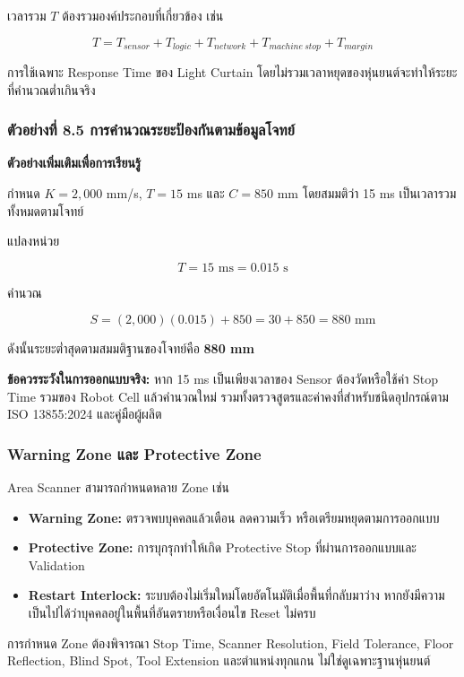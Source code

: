 เวลารวม $T$ ต้องรวมองค์ประกอบที่เกี่ยวข้อง เช่น

\[
T=T_{sensor}+T_{logic}+T_{network}+T_{machine\ stop}+T_{margin}
\]

การใช้เฉพาะ Response Time ของ Light Curtain โดยไม่รวมเวลาหยุดของหุ่นยนต์จะทำให้ระยะที่คำนวณต่ำเกินจริง

\subsubsection{ตัวอย่างที่ 8.5 การคำนวณระยะป้องกันตามข้อมูลโจทย์}

\textbf{ตัวอย่างเพิ่มเติมเพื่อการเรียนรู้}

กำหนด $K=2{,}000$ mm/s, $T=15$ ms และ $C=850$ mm โดยสมมติว่า 15 ms เป็นเวลารวมทั้งหมดตามโจทย์

แปลงหน่วย

\[
T=15\text{ ms}=0.015\text{ s}
\]

คำนวณ

\[
S=(2{,}000)(0.015)+850=30+850=880\text{ mm}
\]

ดังนั้นระยะต่ำสุดตามสมมติฐานของโจทย์คือ \textbf{880 mm}

\textbf{ข้อควรระวังในการออกแบบจริง:} หาก 15 ms เป็นเพียงเวลาของ Sensor ต้องวัดหรือใช้ค่า Stop Time รวมของ Robot Cell แล้วคำนวณใหม่ รวมทั้งตรวจสูตรและค่าคงที่สำหรับชนิดอุปกรณ์ตาม ISO 13855:2024 และคู่มือผู้ผลิต

\subsubsection{Warning Zone และ Protective Zone}

Area Scanner สามารถกำหนดหลาย Zone เช่น

\begin{itemize}
    \item \textbf{Warning Zone:} ตรวจพบบุคคลแล้วเตือน ลดความเร็ว หรือเตรียมหยุดตามการออกแบบ
    \item \textbf{Protective Zone:} การบุกรุกทำให้เกิด Protective Stop ที่ผ่านการออกแบบและ Validation
    \item \textbf{Restart Interlock:} ระบบต้องไม่เริ่มใหม่โดยอัตโนมัติเมื่อพื้นที่กลับมาว่าง หากยังมีความเป็นไปได้ว่าบุคคลอยู่ในพื้นที่อันตรายหรือเงื่อนไข Reset ไม่ครบ
\end{itemize}

การกำหนด Zone ต้องพิจารณา Stop Time, Scanner Resolution, Field Tolerance, Floor Reflection, Blind Spot, Tool Extension และตำแหน่งทุกแกน ไม่ใช่ดูเฉพาะฐานหุ่นยนต์

